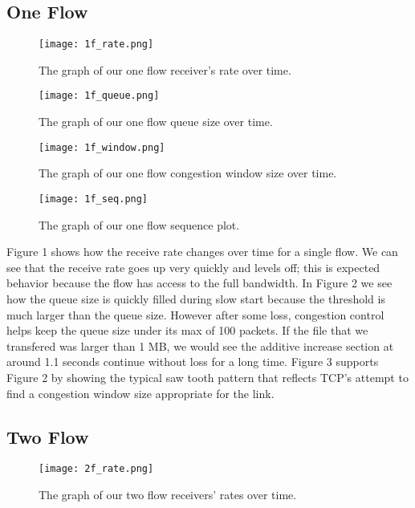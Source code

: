 \documentclass[11pt]{article}
\begin{document}
\subsection{One Flow}
  
\begin{figure}[H]
\caption{The graph of our one flow receiver's rate over time.}
	\label{figure1}
  	\centering
  	\texttt{[image: 1f\_rate.png]}
\end{figure}

\begin{figure}[H]
\caption{The graph of our one flow queue size over time.}
  \label{figure2}
    \centering
    \texttt{[image: 1f\_queue.png]}
\end{figure}

\begin{figure}[H]
\caption{The graph of our one flow congestion window size over time.}
  \label{figure3}
    \centering
    \texttt{[image: 1f\_window.png]}
\end{figure}

\begin{figure}[H]
\caption{The graph of our one flow sequence plot.}
  \label{figure4}
    \centering
    \texttt{[image: 1f\_seq.png]}
\end{figure}

Figure 1 shows how the receive rate changes over time for a single flow. We can see that the receive rate goes up very quickly and levels off; this is expected behavior because the flow has access to the full bandwidth. In Figure 2 we see how the queue size is quickly filled during slow start because the threshold is much larger than the queue size. However after some loss, congestion control helps keep the queue size under its max of 100 packets. If the file that we transfered was larger than 1 MB, we would see the additive increase section at around 1.1 seconds continue without loss for a long time. Figure 3 supports Figure 2 by showing the typical saw tooth pattern that reflects TCP's attempt to find a congestion window size appropriate for the link. 

\subsection{Two Flow}

\begin{figure}[H]
\caption{The graph of our two flow receivers' rates over time.}
  \label{figure5}
    \centering
    \texttt{[image: 2f\_rate.png]}
\end{figure}
\end{document}
